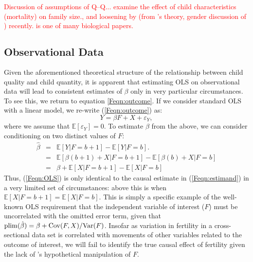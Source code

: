 \textcolor{red}{Discussion of assumptions of Q--Q...
 examine the effect of child 
characteristics (mortality) on family size., and loosening by 
\citet{AizerCunha2012} (from \citet{Behrmanetal1982}'s theory, gender discussion 
of \citet{ButcherCase1994}) recently. \citet{Lawsonetal2012} is one of many 
biological papers.}

\subsection{Observational Data}
Given the aforementioned theoretical structure of the relationship between 
child quality and child quantity, it is apparent that estimating OLS on 
observational data will lead to consistent estimates of $\beta$ only in very
particular circumstances. To see this, we return to equation \ref{Feqn:outcome}.
If we consider standard OLS with a linear model, we re-write 
(\ref{Feqn:outcome}) as:
\[
Y=\beta F + X + \varepsilon_Y,
\]
where we assume that $\mathbb{E}[\varepsilon_Y]=0$.  To estimate $\beta$ from
the above, we can consider conditioning on two distinct values of $F$:
\begin{eqnarray}
\hat\beta & = & \mathbb{E}[Y|F=b+1]-\mathbb{E}[Y|F=b]. \nonumber \\
          & = & \mathbb{E}[\beta(b+1)+X|F=b+1] - \mathbb{E}[\beta(b)+X|F=b] \nonumber \\
          & = & \beta + \mathbb{E}[X|F=b+1] - \mathbb{E}[X|F=b] \label{Feqn:OLS}
\end{eqnarray}
Thus, (\ref{Feqn:OLS}) is only identical to the causal estimate in 
(\ref{Feqn:estimand}) in a very limited set of circumstances: above this is when
$\mathbb{E}[X|F=b+1] = \mathbb{E}[X|F=b]$.  This is simply a specific example of 
the well-known OLS requirement that the independent variable of interest ($F$) 
must be uncorrelated with the omitted error term, given that 
$\operatorname{plim}(\hat\beta)=\beta+\mathrm{Cov}(F,X)/\mathrm{Var}(F)$.  Insofar as variation in fertility
in a cross-sectional data set is correlated with movements of other variables
related to the outcome of interest, we will fail to identify the true causal
effect of fertility given the lack of \citeauthor{Haavelmo1943}'s hypothetical
manipulation of $F$. 


